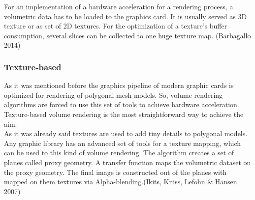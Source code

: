 \documentclass[twoside, english, 11pt]{report}
\begin{document}
For an implementation of a hardware acceleration for a rendering process, a volumetric data has to be loaded to the graphics card. It is usually served as 3D texture or as set of 2D textures. For the optimization of a texture's buffer consumption, several slices can be collected to one huge texture map. (Barbagallo 2014) 

\subsubsection{Texture-based}

As it was mentioned before the graphics pipeline of modern graphic cards is optimized for rendering of polygonal mesh models. So, volume rendering algorithms are forced to use this set of tools to achieve hardware acceleration. Texture-based volume rendering is the most straightforward way to achieve the aim.\\

As it was already said textures are used to add tiny details to polygonal models. Any graphic library has an advanced set of tools for a texture mapping, which can be used to this kind of volume rendering. The algorithm creates a set of planes called proxy geometry. A transfer function maps the volumetric dataset on the proxy geometry. The final image is constructed out of the planes with mapped on them textures via Alpha-blending.(Ikits, Kniss, Lefohn \& Hansen 2007)\\
\end{document}
